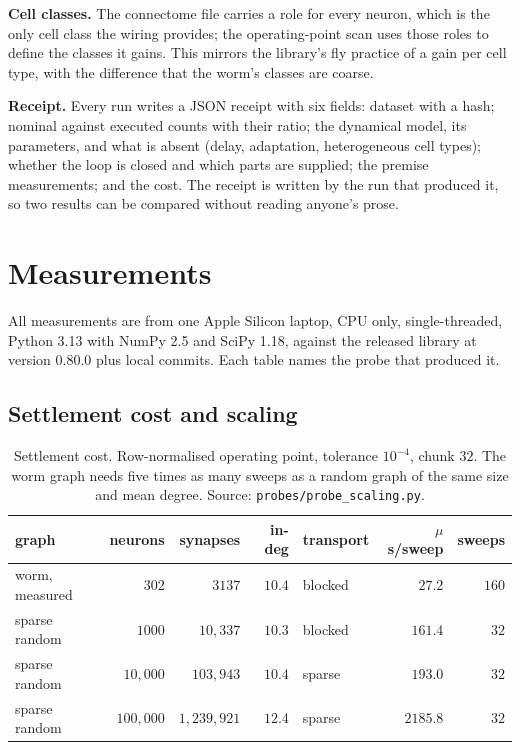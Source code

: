 \documentclass[11pt]{article}
\theoremstyle{remark}
\begin{document}
\textbf{Cell classes.} The connectome file carries a role for every neuron, which is the only cell
class the wiring provides; the operating-point scan uses those roles to define the classes it
gains. This mirrors the library's fly practice of a gain per cell type, with the difference that the
worm's classes are coarse.

\textbf{Receipt.} Every run writes a JSON receipt with six fields: dataset with a hash; nominal
against executed counts with their ratio; the dynamical model, its parameters, and what is absent
(delay, adaptation, heterogeneous cell types); whether the loop is closed and which parts are
supplied; the premise measurements; and the cost. The receipt is written by the run that produced it,
so two results can be compared without reading anyone's prose.

\section{Measurements}

All measurements are from one Apple Silicon laptop, CPU only, single-threaded, Python 3.13 with
NumPy 2.5 and SciPy 1.18, against the released library at version 0.80.0 plus local commits. Each
table names the probe that produced it.

\subsection{Settlement cost and scaling}

\begin{table}[t]
\centering
\small
\caption{Settlement cost. Row-normalised operating point, tolerance $10^{-4}$, chunk $32$. The worm
graph needs five times as many sweeps as a random graph of the same size and mean degree.
Source: \texttt{probes/probe\_scaling.py}.}
\label{tab:scaling}
\begin{tabular}{lrrrlrr}
\toprule
graph & neurons & synapses & in-deg & transport & $\mu$s/sweep & sweeps \\
\midrule
worm, measured & $302$ & $3137$ & $10.4$ & blocked & $27.2$ & $160$ \\
sparse random & $1000$ & $10{,}337$ & $10.3$ & blocked & $161.4$ & $32$ \\
sparse random & $10{,}000$ & $103{,}943$ & $10.4$ & sparse & $193.0$ & $32$ \\
sparse random & $100{,}000$ & $1{,}239{,}921$ & $12.4$ & sparse & $2185.8$ & $32$ \\
\bottomrule
\end{tabular}
\end{table}
\end{document}
